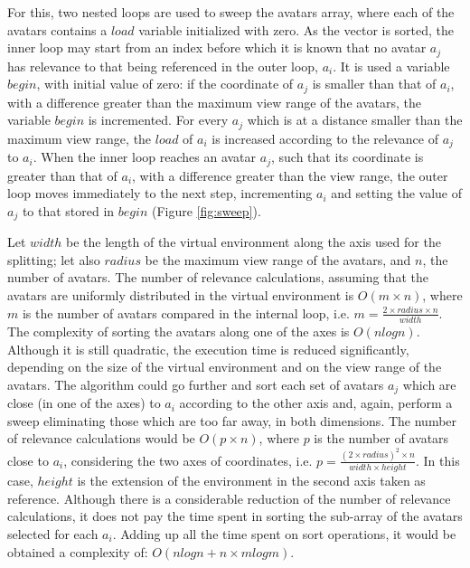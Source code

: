\documentclass[acmjacm]{acmtrans2m}
\begin{document}
For this, two nested loops are used to sweep the avatars array, where each of the avatars contains a $load$ variable initialized with zero. As the vector is sorted, the inner loop may start from an index before which it is known that no avatar $a_j$ has relevance to that being referenced in the outer loop, $a_i$. It is used a variable $begin$, with initial value of zero: if the coordinate of $a_j$ is smaller than that of $a_i$, with a difference greater than the maximum view range of the avatars, the variable $begin$ is incremented. For every $a_j$ which is at a distance smaller than the maximum view range, the $load$ of $a_i$ is increased according to the relevance of $a_j$ to $a_i$. When the inner loop reaches an avatar $a_j$, such that its coordinate is greater than that of $a_i$, with a difference greater than the view range, the outer loop moves immediately to the next step, incrementing $a_i$ and setting the value of $a_j$ to that stored in $begin$ (Figure \ref{fig:sweep}).

Let $width$ be the length of the virtual environment along the axis used for the splitting; let also $radius$ be the maximum view range of the avatars, and $n$, the number of avatars. The number of relevance calculations, assuming that the avatars are uniformly distributed in the virtual environment is \mbox{$O(m \times n)$}, where $m$ is the number of avatars compared in the internal loop, i.e. \mbox{$m = \frac{2 \times radius \times n}{width}$}. The complexity of sorting the avatars along one of the axes is $O(nlogn)$. Although it is still quadratic, the execution time is reduced significantly, depending on the size of the virtual environment and on the view range of the avatars. The algorithm could go further and sort each set of avatars $a_j$ which are close (in one of the axes) to $a_i$ according to the other axis and, again, perform a sweep eliminating those which are too far away, in both dimensions. The number of relevance calculations would be \mbox{$O(p \times n)$}, where $p$ is the number of avatars close to $a_i$, considering the two axes of coordinates, i.e. \mbox{$p = \frac{(2 \times radius)^2 \times n}{width \times height}$}. In this case, $height$ is the extension of the environment in the second axis taken as reference. Although there is a considerable reduction of the number of relevance calculations, it does not pay the time spent in sorting the sub-array of the avatars selected for each $a_i$. Adding up all the time spent on sort operations, it would be obtained a complexity of: \mbox{$O(nlogn + n \times mlogm)$}.
\end{document}
